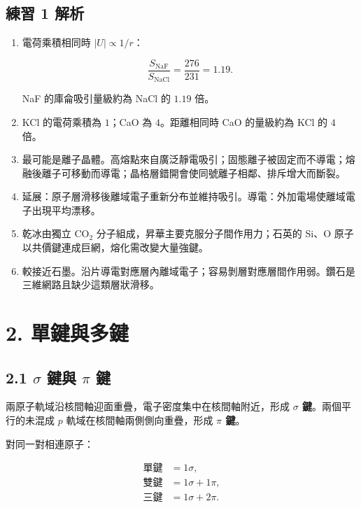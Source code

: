 \documentclass[11pt,a4paper]{article}
\begin{document}
\subsection{練習 1 解析}\label{ux7df4ux7fd2-1-ux89e3ux6790}

\begin{enumerate}
\def\labelenumi{\arabic{enumi}.}
\item
  電荷乘積相同時 \(|U|\propto1/r\)：

  \[
  \frac{S_{\mathrm{NaF}}}{S_{\mathrm{NaCl}}}=\frac{276}{231}=1.19.
  \]

  NaF 的庫侖吸引量級約為 NaCl 的 \(1.19\) 倍。
\item
  KCl 的電荷乘積為 \(1\)；CaO 為 \(4\)。距離相同時 CaO 的量級約為 KCl 的 \(4\) 倍。
\item
  最可能是離子晶體。高熔點來自廣泛靜電吸引；固態離子被固定而不導電；熔融後離子可移動而導電；晶格層錯開會使同號離子相鄰、排斥增大而斷裂。
\item
  延展：原子層滑移後離域電子重新分布並維持吸引。導電：外加電場使離域電子出現平均漂移。
\item
  乾冰由獨立 \(\mathrm{CO_2}\) 分子組成，昇華主要克服分子間作用力；石英的 Si、O 原子以共價鍵連成巨網，熔化需改變大量強鍵。
\item
  較接近石墨。沿片導電對應層內離域電子；容易剝層對應層間作用弱。鑽石是三維網路且缺少這類層狀滑移。
\end{enumerate}

\section{2. 單鍵與多鍵}\label{ux55aeux9375ux8207ux591aux9375}

\subsection{\texorpdfstring{2.1 \(\sigma\) 鍵與 \(\pi\) 鍵}{2.1 \textbackslash sigma 鍵與 \textbackslash pi 鍵}}\label{sigma-ux9375ux8207-pi-ux9375}

兩原子軌域沿核間軸迎面重疊，電子密度集中在核間軸附近，形成 \textbf{\(\sigma\) 鍵}。兩個平行的未混成 \(p\) 軌域在核間軸兩側側向重疊，形成 \textbf{\(\pi\) 鍵}。

對同一對相連原子：

\[
\begin{aligned}
\text{單鍵}&=1\sigma,\\
\text{雙鍵}&=1\sigma+1\pi,\\
\text{三鍵}&=1\sigma+2\pi.
\end{aligned}
\]
\end{document}
